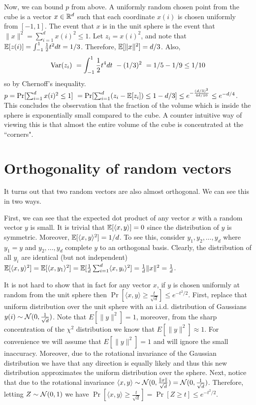 \documentclass{article}
\begin{document}
Now, we can bound $p$ from above. 
A uniformly random chosen point from the cube is a vector $x \in {\mathbb{R}}^d$ such that each coordinate $x(i)$
is chosen uniformly from $[-1,1]$. The event that $x$ is in the unit sphere is the event that $\|x\|^2 = \sum_{i=1}^{d}x(i)^2 \le 1$.
Let $z_i = x(i)^2$, and note that 
${\mathbb E}[z(i)] = \int_{-1}^{1}\frac{1}{2}t^2 dt = 1/3$. Therefore, ${\mathbb E}[\|x\|^2] = d/3$. 
Also, 
\[
\var(z_i)  = \int_{-1}^{1}\frac{1}{2}t^4 dt  - (1/3)^2  = 1/5 - 1/9 \le 1/10
\]
so by Chernoff's inequality.
$p = \Pr[\sum_{i=1}^{d}x(i)^2 \le 1]  = \Pr[\sum_{i=1}^{d}(z_i -\E[z_i] ) \le 1-d/3] \le e^{-\frac{(d/3)^2}{4d/10}} \le e^{-d/4}$.
This concludes the observation that the fraction of the volume which is inside the sphere is 
exponentially small compared to the cube.
A counter intuitive way of viewing this is that almost the entire volume of the cube is concentrated at the ``corners".

\section{Orthogonality of random vectors}

It turns out that two random vectors are also almost orthogonal.
We can see this in two ways.

First, we can see that the expected dot product of any vector $x$ with a random vector $y$ is small.
It is trivial that ${\mathbb E}[\langle x,y \rangle] = 0$ since the distribution of $y$ is symmetric.
Moreover, ${\mathbb E}[\langle x,y \rangle^2] = 1/d$.
To see this, consider $y_1,y_2,\ldots,y_d$ where $y_1 = y$ and $y_2,\ldots,y_d$ complete $y$ to an orthogonal basis.
Clearly, the distribution of all $y_i$ are identical (but not independent)
${\mathbb E}[\langle x,y \rangle^2] = {\mathbb E}[\langle x,y_1\rangle^2] = {\mathbb E}[\frac{1}{d}\sum_{i=1}^{d}\langle x,y_i\rangle^2] = \frac{1}{d}\|x\|^2 = \frac{1}{d}$.

It is not hard to show that in fact for any vector $x$, if $y$ is chosen uniformly at random from the unit sphere 
then $\Pr[ \langle x,y \rangle  \ge \frac{t}{\sqrt{d}}] \le e^{-t^2/2}$.
First, replace that uniform distribution over the unit sphere with an i.i.d. distribution of Gaussians $y(i)\sim {\mathcal{N}}(0,\frac{1}{\sqrt{d}})$.
Note that $E[\|y\|^2] = 1$, moreover, from the sharp concentration of the $\chi^2$ distribution we know that $E[\|y\|^2] \approx 1$.
For convenience we will assume that $E[\|y\|^2] = 1$ and will ignore the small inaccuracy.
Moreover, due to the rotational invariance of the Gaussian distribution we have that any direction is equally likely and thus this
new distribution approximates the uniform distribution over the sphere.
Next, notice that due to the rotational invariance $\langle x,y \rangle \sim {\mathcal{N}}(0,\frac{\|x\|}{\sqrt{d}}) = {\mathcal{N}}(0,\frac{1}{\sqrt{d}})$.
Therefore, letting $Z \sim {\mathcal{N}}(0,1)$ we have $\Pr[ \langle x,y \rangle  \ge \frac{t}{\sqrt{d}}] = \Pr[Z \ge t] \le e^{-t^2/2}$.
\end{document}
